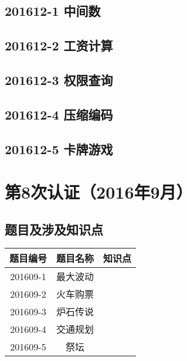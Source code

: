 \documentclass[cn,10pt,math=newtx,citestyle=gb7714-2015,bibstyle=gb7714-2015]{elegantbook}
\newif\ifonlyanalyze %
\begin{document}
\newpage
\section{201612-1 中间数}
\ifonlyanalyze
\else
    
\fi


\newpage
\section{201612-2 工资计算}
\ifonlyanalyze
\else
    
\fi


\newpage
\section{201612-3 权限查询}
\ifonlyanalyze
\else
    
\fi


\newpage
\section{201612-4 压缩编码}
\ifonlyanalyze
\else
    
\fi


\newpage
\section{201612-5 卡牌游戏}
\ifonlyanalyze
\else
    
\fi



\chapter{第8次认证（2016年9月）}

\section{题目及涉及知识点}

\begin{table}[htbp]
    \centering
    \begin{tabular}{ccc}
        \toprule
        题目编号 & 题目名称 & 知识点 \\
        \midrule
        201609-1 & 最大波动 &        \\
        201609-2 & 火车购票 &        \\
        201609-3 & 炉石传说 &        \\
        201609-4 & 交通规划 &        \\
        201609-5 & 祭坛     &        \\
        \bottomrule
    \end{tabular}
\end{table}
\end{document}
